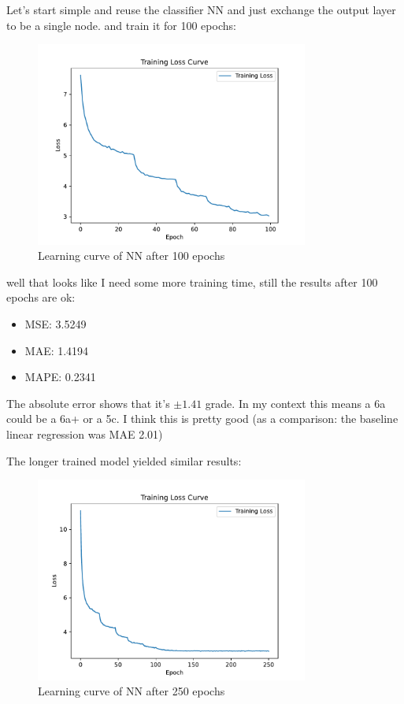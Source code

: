 \documentclass{article}
\begin{document}


Let's start simple and reuse the classifier NN and just exchange the output layer to be a single node. and train it for 100 epochs:
\begin{figure}[H]
    \centering    
    \includegraphics[width=0.8\textwidth]{../Models/NN_Linear/nn_learning_curve_epoch_100.pdf}
    \caption{Learning curve of NN after 100 epochs}\label{fig:learning_curve_nn_linear_100}
\end{figure}
well that looks like I need some more training time, still the results after 100 epochs are ok:

\begin{itemize}
    \item MSE: 3.5249
    \item MAE: 1.4194
    \item MAPE: 0.2341
\end{itemize}

The absolute error shows that it's $\pm 1.41$ grade. In my context this means a 6a could be a 6a+ or a 5c.
I think this is pretty good (as a comparison: the baseline linear regression was MAE 2.01)

The longer trained model yielded similar results:
\begin{figure}[H]
    \centering    
    \includegraphics[width=0.8\textwidth]{../Models/NN_Linear/nn_learning_curve_epoch_251.pdf}
    \caption{Learning curve of NN after 250 epochs}\label{fig:learning_curve_nn_linear_250}
\end{figure}
\end{document}
